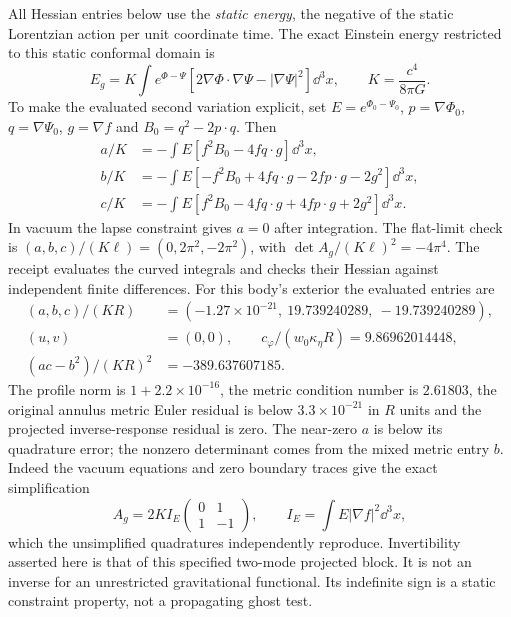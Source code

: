 All Hessian entries below use the \emph{static energy}, the negative of
the static Lorentzian action per unit coordinate time. The exact
Einstein energy restricted to this static conformal domain is
\begin{equation}
 E_g=K\int e^{\Phi-\Psi}
       [2\nabla\Phi\cdot\nabla\Psi-|\nabla\Psi|^2]\dd^3x,
 \qquad K=\frac{c^4}{8\pi G} .
 \label{eq:sl-exact-energy}
\end{equation}
To make the evaluated second variation explicit, set
$E=e^{\Phi_0-\Psi_0}$, $p=\nabla\Phi_0$, $q=\nabla\Psi_0$,
$g=\nabla f$ and $B_0=q^2-2p\cdot q$. Then
\begin{align}
 a/K&=-\int E[f^2B_0-4f q\cdot g]\dd^3x,\\
 b/K&=-\int E[-f^2B_0+4f q\cdot g-2f p\cdot g-2g^2]\dd^3x,\\
 c/K&=-\int E[f^2B_0-4f q\cdot g+4f p\cdot g+2g^2]\dd^3x.
 \label{eq:sl-exact-hessian}
\end{align}
In vacuum the lapse constraint gives $a=0$ after integration. The
flat-limit check is $(a,b,c)/(K\ell)=(0,2\pi^2,-2\pi^2)$, with
$\det A_g/(K\ell)^2=-4\pi^4$. The receipt evaluates the curved integrals and
checks their Hessian against independent finite differences.
For this body's exterior the evaluated entries are
\begin{align}
 (a,b,c)/(KR)&=(-1.27\times10^{-21},\ 19.739240289,\ -19.739240289),\\
 (u,v)&=(0,0),\qquad
 c_\varphi/(w_0\kappa_\eta R)=9.86962014448,\\
 (ac-b^2)/(KR)^2&=-389.637607185 .
\end{align}
The profile norm is $1+2.2\times10^{-16}$, the metric condition number
is $2.61803$, the original annulus metric Euler residual is below
$3.3\times10^{-21}$ in $R$ units and the projected inverse-response
residual is zero. The near-zero $a$ is below its quadrature error;
the nonzero determinant comes from the mixed metric entry $b$.
Indeed the vacuum equations and zero boundary traces give the exact
simplification
\begin{equation}
 A_g=2KI_E\begin{pmatrix}0&1\\1&-1\end{pmatrix},\qquad
 I_E=\int E|\nabla f|^2\dd^3x,
\end{equation}
which the unsimplified quadratures independently reproduce.
Invertibility asserted here is that of this specified two-mode projected
block. It is not an inverse for an unrestricted gravitational functional.
Its indefinite sign is a static constraint property, not a propagating
ghost test.

